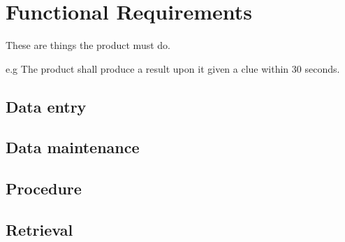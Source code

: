 \section{Functional Requirements}

These are things the product must do.

e.g The product shall produce a result upon it given a clue within 30 seconds.


\subsection{Data entry}

\subsection{Data maintenance}

\subsection{Procedure}

\subsection{Retrieval}

